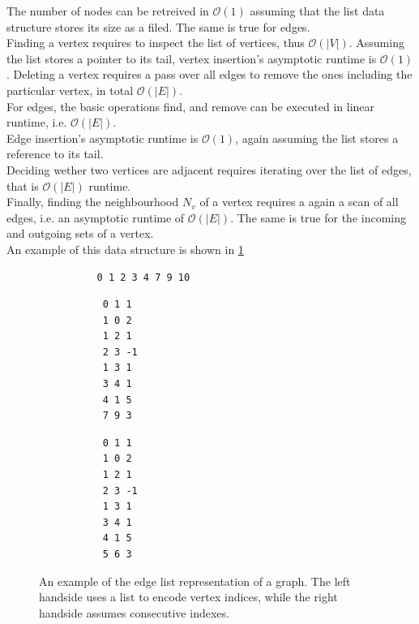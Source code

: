         The number of nodes can be retreived in $\mathcal{O}(1)$ assuming that the list data structure stores its size as a filed. 
        The same is true for edges.\\

        Finding a vertex requires to inspect the list of vertices, thus $\mathcal{O}(|V|)$. 
        Assuming the list stores a pointer to its tail, vertex insertion's asymptotic runtime is $\mathcal{O}(1)$. 
        Deleting a vertex requires a pass over all edges to remove the ones including the particular vertex, in total $\mathcal{O}(|E|)$. \\
        For edges, the basic operations find, and remove can be executed in linear runtime, i.e. $\mathcal{O}(|E|)$. \\
        Edge insertion's asymptotic runtime is $\mathcal{O}(1)$, again assuming the list stores a reference to its tail. \\
        
        Deciding wether two vertices are adjacent requires iterating over the list of edges, that is 
        $\mathcal{O}(|E|)$ runtime.\\
        
        Finally, finding the neighbourhood $N_v$ of a vertex requires a again a scan of all edges, i.e. an asymptotic runtime of $\mathcal{O}(|E|)$. 
        The same is true for the incoming and outgoing sets of a vertex. \\
        
        An example of this data structure is shown in \ref{edgelist}
        
        \begin{figure}[htp]
         \begin{center}
         \begin{minipage}{0.5\textwidth}
         \begin{verbatim}
          0 1 2 3 4 7 9 10
          \end{verbatim}
          \begin{verbatim}
           0 1 1
           1 0 2
           1 2 1
           2 3 -1
           1 3 1
           3 4 1
           4 1 5
           7 9 3
          \end{verbatim}
         \end{minipage}%
         \hfill%
         \begin{minipage}{0.5\textwidth}
          \begin{verbatim}
           0 1 1
           1 0 2
           1 2 1
           2 3 -1
           1 3 1
           3 4 1
           4 1 5
           5 6 3
          \end{verbatim}
         \end{minipage}
         \end{center}
         \caption{%
             An example of the edge list representation of a graph.%
             The left handside uses a list to encode vertex indices, while the right handside assumes consecutive indexes.%
        }
        \label{edgelist}
        \end{figure}

